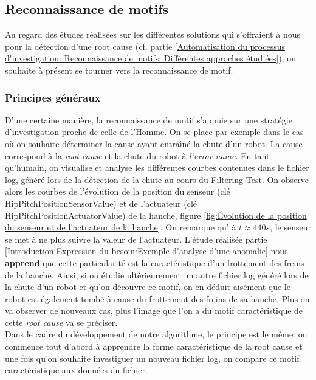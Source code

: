 \subsection{Reconnaissance de motifs}
\label{Automatisation du processus d'investigation: Reconnaissance de motifs}
Au regard des études réalisées sur les différentes solutions qui s'offraient à nous pour la détection d'une root cause (cf. partie \ref{Automatisation du processus d'investigation: Reconnaissance de motifs: Différentes approches étudiées}), on souhaite à présent se tourner vers la reconnaissance de motif. 

\subsubsection{Principes généraux}
\label{Automatisation du processus d'investigation: Reconnaissance de motifs: Principes généraux}
D'une certaine manière, la reconnaissance de motif s'appuie sur une stratégie d'investigation proche de celle de l'Homme. On se place par exemple dans le cas où on souhaite déterminer la cause ayant entraîné la chute d'un robot. La cause correspond à la \emph{root cause} et la chute du robot à \emph{l'error name}. En tant qu'humain, on visualise et analyse les différentes courbes contenues dans le fichier log, généré lors de la détection de la chute au cours du Filtering Test. On observe alors les courbes de l'évolution de la position du senseur (clé HipPitchPositionSensorValue) et de l'actuateur (clé HipPitchPositionActuatorValue) de la hanche, figure \ref{fig:Évolution de la position du senseur et de l'actuateur de la hanche}. On remarque qu' à $t \approx 440 s$, le senseur se met à ne plus suivre la valeur de l'actuateur. L'étude réalisée partie \ref{Introduction:Expression du besoin:Exemple d'analyse d'une anomalie} nous \textbf{apprend} que cette particularité est la caractéristique d'un frottement des freins de la hanche. Ainsi, si on étudie ultérieurement un autre fichier log généré lors de la chute d'un robot et qu'on découvre ce motif, on en déduit aisément que le robot est également tombé à cause du frottement des freins de sa hanche. Plus on va observer de nouveaux cas, plus l'image que l'on a du motif caractéristique de cette \emph{root cause} va se préciser.\\
Dans le cadre du développement de notre algorithme, le principe est le même: on commence tout d'abord à apprendre la forme caractéristique de la root cause et une fois qu'on souhaite investiguer un nouveau fichier log, on compare ce motif caractéristique aux données du fichier. 

